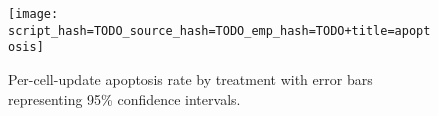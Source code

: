 \begin{figure}[!htbp]
\begin{center}

\texttt{[image: script\_hash=TODO\_source\_hash=TODO\_emp\_hash=TODO+title=apoptosis]}
\caption{
Per-cell-update apoptosis rate by treatment with error bars representing 95\% confidence intervals.
}
\label{fig:apoptosis}
\end{center}
\end{figure}
